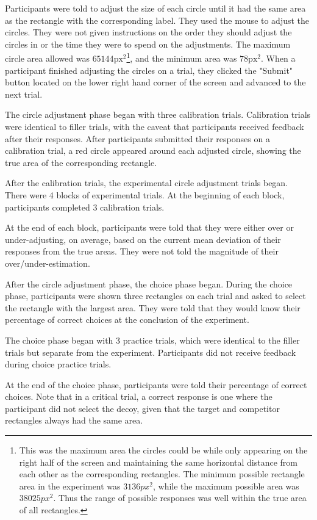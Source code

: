 Participants were told to adjust the size of each circle until it had the same area as the rectangle with the corresponding label. They used the mouse to adjust the circles. They were not given instructions on the order they should adjust the circles in or the time they were to spend on the adjustments. The maximum circle area allowed was $65144 \text{px}^2$\footnote{This was the maximum area the circles could be while only appearing on the right half of the screen and maintaining the same horizontal distance from each other as the corresponding rectangles. The minimum possible rectangle area in the experiment was $3136px^2$, while the maximum possible area was $38025px^2$. Thus the range of possible responses was well within the true area of all rectangles.}, and the minimum area was $78 \text{px}^2$. When a participant finished adjusting the circles on a trial, they clicked the "Submit" button located on the lower right hand corner of the screen and advanced to the next trial. 

The circle adjustment phase began with three calibration trials. Calibration trials were identical to filler trials, with the caveat that participants received feedback after their responses. After participants submitted their responses on a calibration trial, a red circle appeared around each adjusted circle, showing the true area of the corresponding rectangle.  

After the calibration trials, the experimental circle adjustment trials began. There were 4 blocks of experimental trials. At the beginning of each block, participants completed $3$ calibration trials. 

At the end of each block, participants were told that they were either over or under-adjusting, on average, based on the current mean deviation of their responses from the true areas. They were not told the magnitude of their over/under-estimation.

After the circle adjustment phase, the choice phase began. During the choice phase, participants were shown three rectangles on each trial and asked to select the rectangle with the largest area. They were told that they would know their percentage of correct choices at the conclusion of the experiment.

The choice phase began with $3$ practice trials, which were identical to the filler trials but separate from the experiment. Participants did not receive feedback during choice practice trials. 

At the end of the choice phase, participants were told their percentage of correct choices. Note that in a critical trial, a correct response is one where the participant did not select the decoy, given that the target and competitor rectangles always had the same area.

